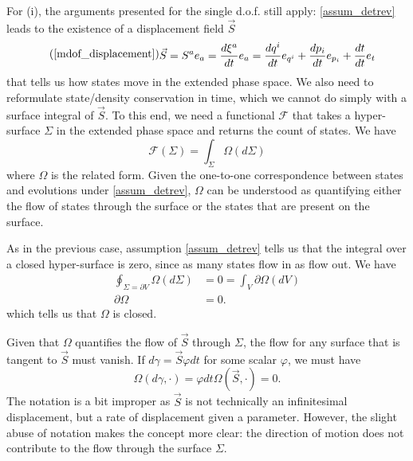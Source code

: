 \documentclass[10pt,twocolumn, nofootinbib]{revtex4-2}
\begin{document}
For (i), the arguments presented for the single d.o.f. still apply: \ref{assum_detrev} leads to the existence of a displacement field $\vec{S}$
\begin{equation}
\tag*{(\ref{mdof_displacement})}
	\begin{aligned}
		\vec{S} &= S^a e_a = \frac{d\xi^a}{dt} e_a =\frac{dq^i}{dt} e_{q^i} + \frac{dp_i}{dt} e_{p_i} + \frac{dt}{dt} e_t
	\end{aligned}
\end{equation}
that tells us how states move in the extended phase space. We also need to reformulate state/density conservation in time, which we cannot do simply with a surface integral of $\vec{S}$. To this end, we need a functional $\mathcal{F}$ that takes a hyper-surface $\Sigma$ in the extended phase space and returns the count of states. We have 
\begin{equation}
	\mathcal{F}(\Sigma) = \int_\Sigma \Omega(d\Sigma)
\end{equation}
where $\Omega$ is the related form. Given the one-to-one correspondence between states and evolutions under \ref{assum_detrev}, $\Omega$ can be understood as quantifying either the flow of states through the surface or the states that are present on the surface.

As in the previous case, assumption \ref{assum_detrev} tells us that the integral over a closed hyper-surface is zero, since as many states flow in as flow out. We have
\begin{equation}
	\begin{aligned}
		\oint_{\Sigma = \partial V} \Omega(d\Sigma) &= 0 = \int_V \partial \Omega(dV) \\
		\partial\Omega &= 0.
	\end{aligned}
\end{equation}
which tells us that $\Omega$ is closed.

Given that $\Omega$ quantifies the flow of $\vec{S}$ through $\Sigma$, the flow for any surface that is tangent to $\vec{S}$ must vanish. If $d\gamma = \vec{S} \varphi dt$ for some scalar $\varphi$, we must have
\begin{equation}
	\Omega(d\gamma, \cdot) = \varphi dt \Omega(\vec{S}, \cdot) = 0.
\end{equation}
The notation is a bit improper as $\vec{S}$ is not technically an infinitesimal displacement, but a rate of displacement given a parameter. However, the slight abuse of notation makes the concept more clear: the direction of motion does not contribute to the flow through the surface $\Sigma$.
\end{document}
